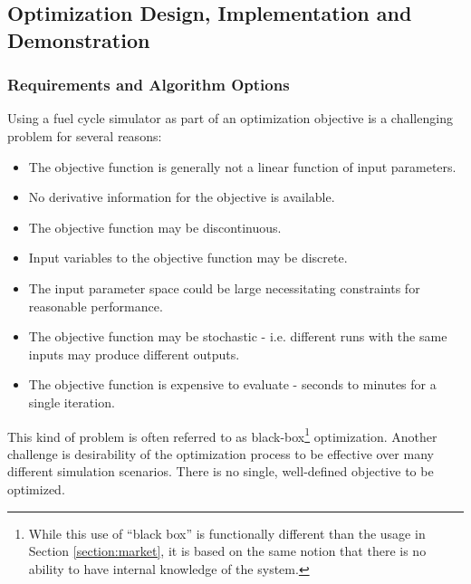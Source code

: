   
\subsection{Optimization Design, Implementation and Demonstration}

\subsubsection{Requirements and Algorithm Options}
Using a fuel cycle simulator as part of an optimization objective is a
challenging problem for several reasons:

\begin{itemize}
\item The objective function is generally not a linear function of input
  parameters.
\item No derivative information for the objective is available.
\item The objective function may be discontinuous.
\item Input variables to the objective function may be discrete.
\item The input parameter space could be large necessitating constraints
  for reasonable performance.
\item The objective function may be stochastic - i.e. different runs with
  the same inputs may produce different outputs.
\item The objective function is expensive to evaluate - seconds to minutes
  for a single iteration.
\end{itemize}

This kind of problem is often referred to as black-box\footnote{While this use
  of ``black box'' is functionally different than the usage in Section
  \ref{section:market}, it is based on the same notion that there is no ability to
  have internal knowledge of the system.}  optimization. Another challenge is
desirability of the optimization process to be effective over many different
simulation scenarios. There is no single, well-defined objective to be
optimized.

